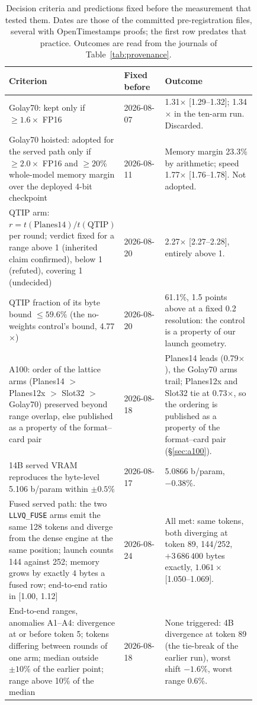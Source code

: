 \begin{table}[H]
\centering
\scriptsize
\setlength{\tabcolsep}{3.5pt}
\renewcommand{\arraystretch}{0.8}
\begin{tabular}{p{0.46\linewidth}lp{0.37\linewidth}}
\toprule
Criterion & Fixed before & Outcome \\
\midrule
Golay70: kept only if $\geq 1.6\times$ FP16 &
2026-08-07 &
1.31$\times$ [1.29--1.32]; 1.34$\times$ in the ten-arm run. Discarded. \\
Golay70 hoisted: adopted for the served path only if $\geq 2.0\times$ FP16
and $\geq 20\%$ whole-model memory margin over the deployed 4-bit checkpoint &
2026-08-11 &
Memory margin 23.3\% by arithmetic; speed 1.77$\times$ [1.76--1.78]. Not
adopted. \\
QTIP arm: $r = t(\text{Planes14})/t(\text{QTIP})$ per round; verdict
fixed for a range above 1 (inherited claim confirmed), below 1 (refuted),
covering 1 (undecided) &
2026-08-20 &
2.27$\times$ [2.27--2.28], entirely above 1. \\
QTIP fraction of its byte bound $\leq 59.6\%$ (the no-weights control's
bound, 4.77$\times$) &
2026-08-20 &
61.1\%, 1.5 points above at a fixed 0.2 resolution: the control is a
property of our launch geometry. \\
A100: order of the lattice arms (Planes14 $>$ Planes12x $>$ Slot32 $>$
Golay70) preserved beyond range overlap, else published as a property of the
format--card pair &
2026-08-18 &
Planes14 leads (0.79$\times$), the Golay70 arms trail; Planes12x and
Slot32 tie at 0.73$\times$, so the ordering is published as a property of
the format--card pair (\S\ref{sec:a100}). \\
14B served VRAM reproduces the byte-level 5.106 b/param within $\pm 0.5\%$ &
2026-08-17 &
5.0866 b/param, $-0.38\%$. \\
Fused served path: the two \texttt{LLVQ\_FUSE} arms emit the same 128 tokens
and diverge from the dense engine at the same position; launch counts 144
against 252; memory grows by exactly $4$ bytes a fused row; end-to-end ratio
in [1.00, 1.12] &
2026-08-24 &
All met: same tokens, both diverging at token 89, 144/252,
$+3\,686\,400$ bytes exactly, $1.061\times$ [1.050--1.069]. \\
End-to-end ranges, anomalies A1--A4: divergence at or before token 5;
tokens differing between rounds of one arm; median outside $\pm 10\%$ of
the earlier point; range above 10\% of the median &
2026-08-18 &
None triggered: 4B divergence at token 89 (the tie-break of the earlier run),
worst shift $-1.6\%$, worst range 0.6\%. \\
\bottomrule
\end{tabular}
\caption{Decision criteria and predictions fixed before the measurement
that tested them. Dates are those of the committed pre-registration files,
several with OpenTimestamps proofs; the first row predates that practice.
Outcomes are read from the journals of Table~\ref{tab:provenance}.}
\label{tab:prereg}
\end{table}

